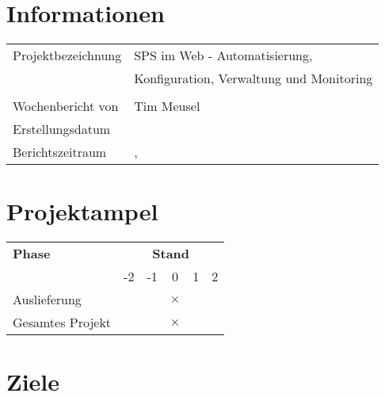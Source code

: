 
\section*{Informationen}

\begin{tabularx}{\textwidth}{lX}
\arrayrulecolor{OliveGreen}
\toprule[2pt]
Projektbezeichnung	         	& SPS im Web - Automatisierung,            	\\
								& Konfiguration, Verwaltung und Monitoring 	\\
         						& 								\\ \midrule
Wochenbericht von				& Tim Meusel                     			\\ \midrule
Erstellungsdatum				& \datum                             		\\ \midrule
Berichtszeitraum				& \berichtsdatum,~\KW							\\
\bottomrule[2pt]
\end{tabularx}

\section*{Projektampel}

\begin{tabularx}{\textwidth}{Xccccc}
\arrayrulecolor{OliveGreen}
\toprule
{\bfseries Phase} 	 & \multicolumn{5}{c}{\bfseries Stand} 			\\ 
\cmidrule(l){2-6}
				 &	-2             & -1                 & 0                       & 1                    & 2		\\
\midrule[2pt]
Auslieferung     & \cellcolor{red} & \cellcolor{red!40} & \cellcolor{green!10}	$\times$ & \cellcolor{green!40} & \cellcolor{green}      \\ \midrule
Gesamtes Projekt & \cellcolor{red} & \cellcolor{red!40} & \cellcolor{green!10}	$\times$ & \cellcolor{green!40} & \cellcolor{green}      \\ 
\bottomrule[2pt]
\end{tabularx}

\section*{Ziele}

